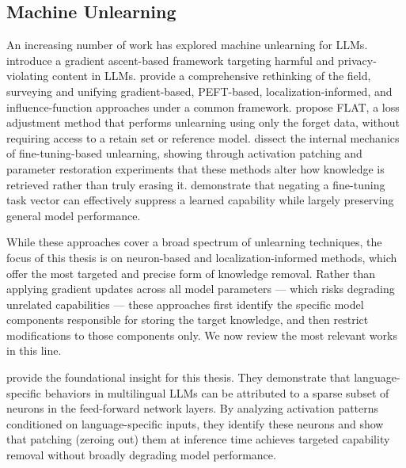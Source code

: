 \documentclass[mscthesis]{usiinfthesis}
\begin{document}
\subsection{Machine Unlearning}
An increasing number of work has explored machine unlearning for LLMs. \citet{yao2024largelanguagemodelunlearning} introduce a gradient ascent-based framework targeting harmful and privacy-violating content in LLMs. \citet{liu2024rethinkingmachineunlearninglarge} provide a comprehensive rethinking of the field, surveying and unifying gradient-based, PEFT-based, localization-informed, and influence-function approaches under a common framework. \citet{wang2024llmunlearninglossadjustment} propose FLAT, a loss adjustment method that performs unlearning using only the forget data, without requiring access to a retain set or reference model. \citet{hong2024dissectingfinetuningunlearninglarge} dissect the internal mechanics of fine-tuning-based unlearning, showing through activation patching and parameter restoration experiments that these methods alter how knowledge is retrieved rather than truly erasing it. \citet{ilharco2023editingmodelstaskarithmetic} demonstrate that negating a fine-tuning task vector can effectively suppress a learned capability while largely preserving general model performance.
\par\vspace{1em}
While these approaches cover a broad spectrum of unlearning techniques, the focus of this thesis is on neuron-based and localization-informed methods, which offer the most targeted and precise form of knowledge removal. Rather than applying gradient updates across all model parameters — which risks degrading unrelated capabilities — these approaches first identify the specific model components responsible for storing the target knowledge, and then restrict modifications to those components only. We now review the most relevant works in this line.
\par\vspace{1em}
\citet{kojima2024multilingualabilitydecoderbasedpretrained} provide the foundational insight for this thesis. They demonstrate that language-specific behaviors in multilingual LLMs can be attributed to a sparse subset of neurons in the feed-forward network layers. By analyzing activation patterns conditioned on language-specific inputs, they identify these neurons and show that patching (zeroing out) them at inference time achieves targeted capability removal without broadly degrading model performance. 
\par\vspace{1em}
\end{document}
